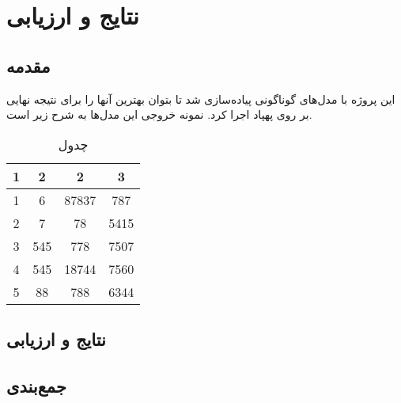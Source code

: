 \chapter{نتایج و ارزیابی}
\section{مقدمه}

این پروژه با مدل‌های گوناگونی پیاده‌سازی شد تا بتوان بهترین آنها را برای نتیجه نهایی بر روی پهپاد اجرا کرد. نمونه خروجی این مدل‌ها به شرح زیر است.

\begin{table}[h!]
    \centering
    \begin{tabular}{||c c c c||} 
     \hline
     1 & 2 & 2 & 3 \\ [0.5ex] 
     \hline\hline
     1 & 6 & 87837 & 787 \\ 
     2 & 7 & 78 & 5415 \\
     3 & 545 & 778 & 7507 \\
     4 & 545 & 18744 & 7560 \\
     5 & 88 & 788 & 6344 \\ [1ex] 
     \hline
    \end{tabular}
    \caption{چدول}
    \label{table:1}
\end{table}


\section{نتایج و ارزیابی}

\section{جمع‌بندی}